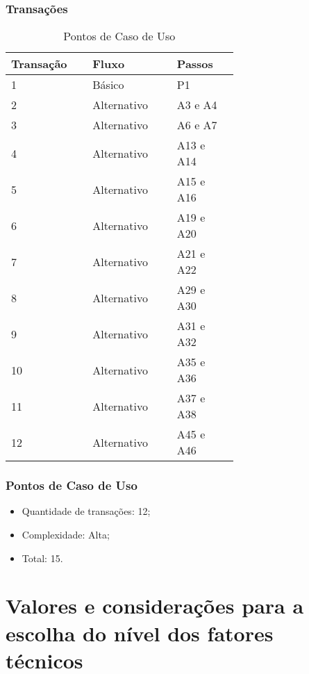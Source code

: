 \subsubsection{Transações}

\begin{table*}[!h]
\centering
\caption{Pontos de Caso de Uso}
\label{Rotulo}
  \begin{tabular}{|p{0.20\linewidth}|p{0.25\linewidth}|p{0.20\linewidth}|}
  \hline
  \textbf{Transação} & \textbf{Fluxo} & \textbf{Passos} \\ 
  \hline
  1 & Básico & P1\\
  \hline
  2 & Alternativo & A3 e A4\\
  \hline
  3 & Alternativo & A6 e A7\\
  \hline
  4 & Alternativo & A13 e A14\\
  \hline
  5 & Alternativo & A15 e A16\\
  \hline
  6 & Alternativo & A19 e A20\\
   \hline
  7 & Alternativo & A21 e A22\\
   \hline
  8 & Alternativo & A29 e A30\\
     \hline
  9 & Alternativo & A31 e A32\\
     \hline
  10 & Alternativo & A35 e A36\\
     \hline
  11 & Alternativo & A37 e A38\\
     \hline
  12 & Alternativo & A45 e A46\\
  \hline
  \end{tabular}
\end{table*}

\pagebreak
\subsubsection{Pontos de Caso de Uso}

\begin{itemize}
 \item Quantidade de transações: 12;
 \item Complexidade: Alta;
 \item Total: 15.
\end{itemize}

\vfill

\section{Valores e considerações para a escolha do nível dos fatores técnicos}

